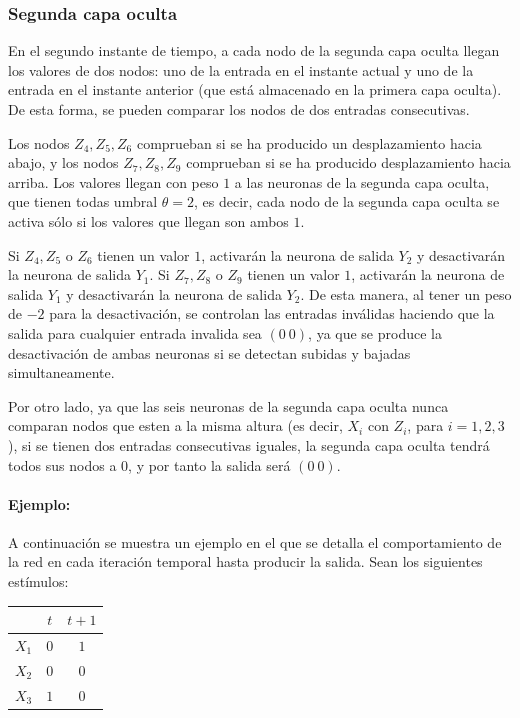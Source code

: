 \documentclass[spanish]{assignment}
\begin{document}
	\subsubsection{Segunda capa oculta}
	En el segundo instante de tiempo, a cada nodo de la segunda capa oculta llegan los valores de dos nodos: uno de la entrada en el instante actual y uno de la entrada en el instante anterior (que está almacenado en la primera capa oculta). De esta forma, se pueden comparar los nodos de dos entradas consecutivas.
	
	Los nodos $Z_4, Z_5, Z_6$ comprueban si se ha producido un desplazamiento hacia abajo, y los nodos $Z_7, Z_8, Z_9$ comprueban si se ha producido desplazamiento hacia arriba.	Los valores llegan con peso $1$ a las neuronas de la segunda capa oculta, que tienen todas umbral $\theta=2$, es decir, cada nodo de la segunda capa oculta se activa sólo si los valores que llegan son ambos $1$.
	
	Si $Z_4, Z_5$ o $Z_6$ tienen un valor $1$, activarán la neurona de salida $Y_2$ y desactivarán la neurona de salida $Y_1$. Si $Z_7, Z_8$ o $Z_9$ tienen un valor $1$, activarán la neurona de salida $Y_1$ y desactivarán la neurona de salida $Y_2$. De esta manera, al tener un peso de $-2$ para la desactivación, se controlan las entradas inválidas haciendo que la salida para cualquier entrada invalida sea $(0\ 0)$, ya que se produce la desactivación de ambas neuronas si se detectan subidas y bajadas simultaneamente.
	
	Por otro lado, ya que las seis neuronas de la segunda capa oculta nunca comparan nodos que esten a la misma altura (es decir, $X_i$ con $Z_i$, para $i=1,2,3$), si se tienen dos entradas consecutivas iguales, la segunda capa oculta tendrá todos sus nodos a $0$, y por tanto la salida será $(0\ 0)$.

	\newpage
	\paragraph{Ejemplo:}
	A continuación se muestra un ejemplo en el que se detalla el comportamiento de la red en cada iteración temporal hasta producir la salida. Sean los siguientes estímulos:
	\begin{center}
		\begin{tabular}{c|c|c|}
			& $t$ & $t+1$ \\
			\hline
			$X_1$ & $0$ & $1$   \\
			$X_2$ & $0$ & $0$   \\
			$X_3$ & $1$ & $0$  
		\end{tabular}
	\end{center}
	
\end{document}
